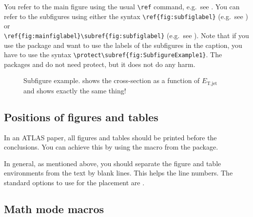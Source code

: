 You refer to the main figure using the usual \verb|\ref| command, e.g.\ see \Fig{\ref{fig:subfigexample}}.
You can refer to the subfigures using either the syntax \verb|\ref{fig:subfiglabel}| 
(e.g.\ see \Fig{\ref{fig:SubfigureExample2}}) or\\
\verb|\ref{fig:mainfiglabel}\subref{fig:subfiglabel}|
(e.g.\ see ).
Note that if you use the  package and want to use the labels of the subfigures in the caption,
you have to use the syntax \verb|\protect\subref{fig:SubfigureExample1}|.
The packages  and  do not need protect, but it does not do any harm.

\begin{figure}[htbp]
  \centering
  \caption{Subfigure example.
    \protect{} shows the cross-section as a function of $E_{\text{T,jet}}$ and 
    \protect{} shows exactly the same thing!}
  \label{fig:subfigexample}
\end{figure}


\subsection{Positions of figures and tables}

In an ATLAS paper, all figures and tables should be printed before the conclusions.
You can achieve this by using the macro  from the
 package.

In general, as mentioned above, you should separate the figure and table environments from the text by blank lines.
This helps the line numbers. The standard options to use for the placement are \Option{[htbp]}.


\subsection{Math mode macros}%
\label{sec:math}

